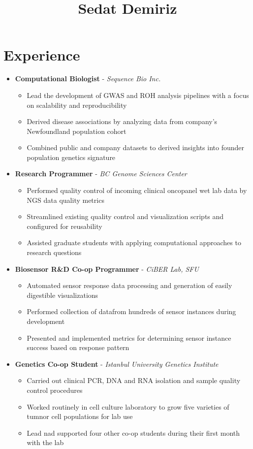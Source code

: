 \documentclass{article}
\title{Sedat Demiriz}
\begin{document}
  \maketitle

\section*{Experience} \vspace{-.3cm}
\hrulefill
\begin{itemize}
  \item[] \textbf{Computational Biologist} - \textit{Sequence Bio Inc.}
    \begin{itemize}
      \item[] Lead the development of GWAS and ROH analysis pipelines with a focus on scalability and reproducibility
      \item[] Derived disease associations by analyzing data from company's Newfoundland population cohort
      \item[] Combined public and company datasets to derived insights into founder population genetics signature
    \end{itemize}
  \item[] \textbf{Research Programmer} - \textit{BC Genome Sciences Center}
    \begin{itemize}
      \item[] Performed quality control of incoming clinical oncopanel wet lab data by NGS data quality metrics
      \item[] Streamlined existing quality control and visualization scripts and configured for reusability
      \item[] Assisted graduate students with applying computational approaches to research questions
    \end{itemize}
  \item[] \textbf{Biosensor R\&D Co-op Programmer} - \textit{CiBER Lab, SFU}
    \begin{itemize}
      \item[] Automated sensor response data processing and generation of easily digestible visualizations
      \item[] Performed collection of datafrom hundreds of sensor instances during development
      \item[] Presented and implemented metrics for determining sensor instance success based on response pattern
    \end{itemize}
  \item[] \textbf{Genetics Co-op Student} - \textit{Istanbul University Genetics Institute}
    \begin{itemize}
      \item[] Carried out clinical PCR, DNA and RNA isolation and sample quality control procedures
      \item[] Worked routinely in cell culture laboratory to grow five varieties of tumnor cell populations for lab use
      \item[] Lead nad supported four other co-op students during their first month with the lab
    \end{itemize}
\end{itemize}
\end{document}
